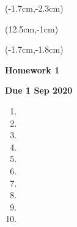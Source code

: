 \documentclass[12pt, oneside]{article}
\begin{document}
\begin{textblock*}{4cm}(-1.7cm,-2.3cm)
\end{textblock*}

\begin{textblock*}{8cm}(12.5cm,-1cm)
\end{textblock*}
\begin{textblock*}{13.5cm}(-1.7cm,-1.8cm)
\end{textblock*}

\vspace{1cm}

\begin{center}
\textbf{\Large Homework 1}

\textbf{Due 1 Sep 2020}
\end{center}

\begin{enumerate}
	\item %

	\item %

	\item %

	\item %

	\item %

	\item %

	\item %

	\item %

	\item %

	\item %
\end{enumerate}
\end{document}
